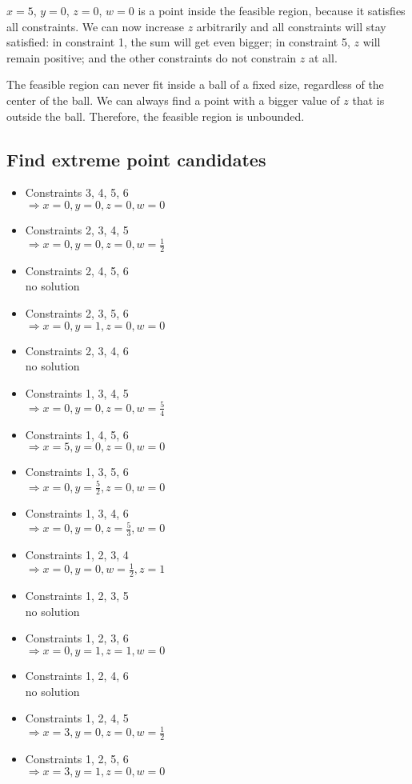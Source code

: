 \documentclass[12pt]{article}
\begin{document}
$x=5$, $y=0$, $z=0$, $w=0$ is a point inside the feasible region, because it satisfies all constraints. We can now increase $z$ arbitrarily and all constraints will stay satisfied: in constraint 1, the sum will get even bigger; in constraint 5, $z$ will remain positive; and the other constraints do not constrain $z$ at all.

The feasible region can never fit inside a ball of a fixed size, regardless of the center of the ball. We can always find a point with a bigger value of $z$ that is outside the ball. Therefore, the feasible region is unbounded.

\subsection*{Find extreme point candidates}
\begin{itemize}
	\item Constraints 3, 4, 5, 6 \\ $\Rightarrow x=0, y=0, z=0, w=0$
	\item Constraints 2, 3, 4, 5 \\ $\Rightarrow x=0, y=0, z=0, w=\frac{1}{2}$
	\item Constraints 2, 4, 5, 6 \\ no solution
	\item Constraints 2, 3, 5, 6 \\ $\Rightarrow x=0, y=1, z=0, w=0$
	\item Constraints 2, 3, 4, 6 \\ no solution
	\item Constraints 1, 3, 4, 5 \\ $\Rightarrow x=0, y=0, z=0, w=\frac{5}{4}$
	\item Constraints 1, 4, 5, 6 \\ $\Rightarrow x=5, y=0, z=0, w=0$
	\item Constraints 1, 3, 5, 6 \\ $\Rightarrow x=0, y=\frac{5}{2}, z=0, w=0$
	\item Constraints 1, 3, 4, 6 \\ $\Rightarrow x=0, y=0, z=\frac{5}{3}, w=0$
	\item Constraints 1, 2, 3, 4 \\ $\Rightarrow x=0, y=0, w=\frac{1}{2}, z=1$
	\item Constraints 1, 2, 3, 5 \\ no solution
	\item Constraints 1, 2, 3, 6 \\ $\Rightarrow x=0, y=1, z=1, w=0$
	\item Constraints 1, 2, 4, 6 \\ no solution
	\item Constraints 1, 2, 4, 5 \\ $\Rightarrow x=3, y=0, z=0, w=\frac{1}{2}$
	\item Constraints 1, 2, 5, 6 \\ $\Rightarrow x=3, y=1, z=0, w=0$
\end{itemize}
\end{document}
